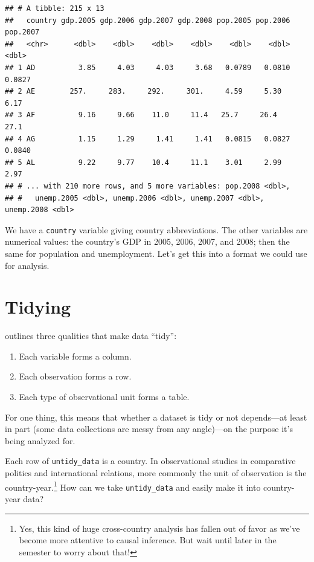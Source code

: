 \documentclass[12pt,oneside,openany]{book}
\providecommand{\tightlist}{%
  \setlength{\itemsep}{0pt}\setlength{\parskip}{0pt}}
\begin{document}
\begin{verbatim}
## # A tibble: 215 x 13
##   country gdp.2005 gdp.2006 gdp.2007 gdp.2008 pop.2005 pop.2006 pop.2007
##   <chr>      <dbl>    <dbl>    <dbl>    <dbl>    <dbl>    <dbl>    <dbl>
## 1 AD          3.85     4.03     4.03     3.68   0.0789   0.0810   0.0827
## 2 AE        257.     283.     292.     301.     4.59     5.30     6.17  
## 3 AF          9.16     9.66    11.0     11.4   25.7     26.4     27.1   
## 4 AG          1.15     1.29     1.41     1.41   0.0815   0.0827   0.0840
## 5 AL          9.22     9.77    10.4     11.1    3.01     2.99     2.97  
## # ... with 210 more rows, and 5 more variables: pop.2008 <dbl>,
## #   unemp.2005 <dbl>, unemp.2006 <dbl>, unemp.2007 <dbl>, unemp.2008 <dbl>
\end{verbatim}

We have a \texttt{country} variable giving country abbreviations. The
other variables are numerical values: the country's GDP in 2005, 2006,
2007, and 2008; then the same for population and unemployment. Let's get
this into a format we could use for analysis.

\section{Tidying}\label{tidying}

\citet{Wickham:2014vp} outlines three qualities that make data ``tidy'':

\begin{enumerate}
\def\labelenumi{\arabic{enumi}.}
\tightlist
\item
  Each variable forms a column.
\item
  Each observation forms a row.
\item
  Each type of observational unit forms a table.
\end{enumerate}

For one thing, this means that whether a dataset is tidy or not
depends---at least in part (some data collections are messy from any
angle)---on the purpose it's being analyzed for.

Each row of \texttt{untidy\_data} is a country. In observational studies
in comparative politics and international relations, more commonly the
unit of observation is the country-year.\footnote{Yes, this kind of huge
  cross-country analysis has fallen out of favor as we've become more
  attentive to causal inference. But wait until later in the semester to
  worry about that!} How can we take \texttt{untidy\_data} and easily
make it into country-year data?
\end{document}
